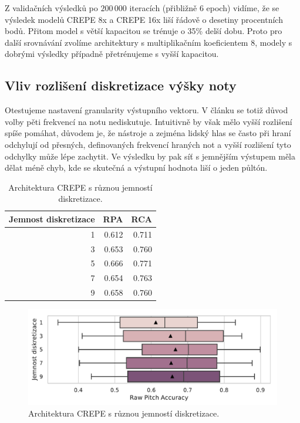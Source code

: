 Z validačních výsledků po $200\,000$ iteracích (přibližně 6 epoch) vidíme, že se výsledek modelů CREPE 8x a CREPE 16x liší řádově o desetiny procentních bodů. Přitom model s větší kapacitou se trénuje o 35\% delší dobu. Proto pro další srovnávání zvolíme architektury s multiplikačním koeficientem 8, modely s dobrými výsledky případně přetrénujeme s vyšší kapacitou.

\subsection{Vliv rozlišení diskretizace výšky noty}

Otestujeme nastavení granularity výstupního vektoru. V článku \cite{Kim2018} se totiž důvod volby pěti frekvencí na notu nediskutuje. Intuitivně by však mělo vyšší rozlišení spíše pomáhat, důvodem je, že nástroje a zejména lidský hlas se často při hraní odchylují od přesných, definovaných frekvencí hraných not a vyšší rozlišení tyto odchylky může lépe zachytit. Ve výsledku by pak síť s jemnějším výstupem měla dělat méně chyb, kde se skutečná a výstupní hodnota liší o jeden půltón.


\begin{table}[h!]

\centering
    \begin{tabular}{rrr}
    \toprule
    Jemnost diskretizace &   RPA &   RCA \\
    \midrule
                    1 & 0.612 & 0.711 \\
                    3 & 0.653 & 0.760 \\
                    5 & 0.666 & 0.771 \\
                    7 & 0.654 & 0.763 \\
                    9 & 0.658 & 0.760 \\
    \bottomrule
    \end{tabular}

\caption{Architektura CREPE s různou jemností diskretizace.}\label{tab:crepe_diskretizace}

\end{table}

\begin{figure}[h]\centering
    \includegraphics[scale=0.6]{../img/figures/crepe_diskretizace.pdf}
\caption{Architektura CREPE s různou jemností diskretizace.}\label{obr:crepe_diskretizace}
\end{figure}

